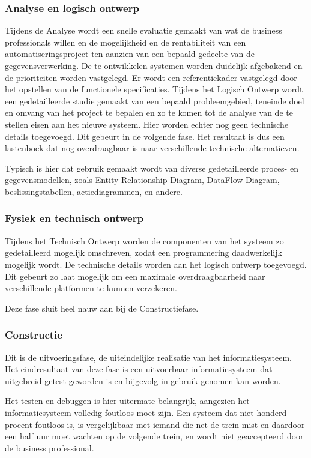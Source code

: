 \subsubsection{Analyse en logisch ontwerp}

Tijdens de Analyse wordt een snelle evaluatie gemaakt van wat de business professionals willen en de mogelijkheid en de rentabiliteit van een automatiseringsproject ten aanzien van een bepaald gedeelte van de gegevensverwerking. De te ontwikkelen systemen worden duidelijk afgebakend en de prioriteiten worden vastgelegd. Er wordt een referentiekader vastgelegd door het opstellen van de functionele specificaties.
Tijdens het Logisch Ontwerp wordt een gedetailleerde studie gemaakt van een bepaald probleemgebied, teneinde doel en omvang van het project te bepalen en zo te komen tot de analyse van de te stellen eisen aan het nieuwe systeem. Hier worden echter nog geen technische details toegevoegd. Dit gebeurt in de volgende fase. Het resultaat is dus een lastenboek dat nog overdraagbaar is naar verschillende technische alternatieven.

Typisch is hier dat gebruik gemaakt wordt van diverse gedetailleerde proces- en gegevensmodellen, zoals Entity Relationship Diagram, DataFlow Diagram, beslissingstabellen, actiediagrammen, en andere.

\subsubsection{Fysiek en technisch ontwerp}

Tijdens het Technisch Ontwerp worden de componenten van het systeem zo gedetailleerd mogelijk omschreven, zodat een programmering daadwerkelijk mogelijk wordt. De technische details worden aan het logisch ontwerp toegevoegd. Dit gebeurt zo laat mogelijk om een maximale overdraagbaarheid naar verschillende platformen te kunnen verzekeren.

Deze fase sluit heel nauw aan bij de Constructiefase.

\subsubsection{Constructie}

Dit is de uitvoeringsfase, de uiteindelijke realisatie van het informatiesysteem. Het eindresultaat van deze fase is een uitvoerbaar informatiesysteem dat uitgebreid getest geworden is en bijgevolg in gebruik genomen kan worden.

Het testen en debuggen is hier uitermate belangrijk, aangezien het informatiesysteem volledig foutloos moet zijn. Een systeem dat niet honderd procent foutloos is, is vergelijkbaar met iemand die net de trein mist en daardoor een half uur moet wachten op de volgende trein, en wordt niet geaccepteerd door de business professional.


